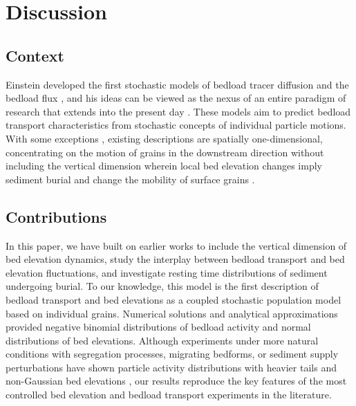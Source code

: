 \section{Discussion}
\label{sec:discussion}

\subsection{Context}
Einstein developed the first stochastic models of bedload tracer diffusion \citep{Einstein1937} and the bedload flux \citep{Einstein1950}, and his ideas can be viewed as the nexus of an entire paradigm of research that extends into the present day \citep[e.g.,][]{Hubbell1964, Nakagawa1976,Hassan1991,Ancey2008, Wu2019}.
These models aim to predict bedload transport characteristics from stochastic concepts of individual particle motions.
With some exceptions \citep{Yang1971,Nakagawa1980,Pelosi2016,Wu2019,Wu2019a}, existing descriptions are spatially one-dimensional, concentrating on the motion of grains in the downstream direction without including the vertical dimension wherein local bed elevation changes imply sediment burial \citep{Voepel2013,Martin2014} and change the mobility of surface grains \citep{Yang1971,Nakagawa1980}.

\subsection{Contributions}

In this paper, we have built on earlier works \citep{Ancey2008,Martin2014} to include the vertical dimension of bed elevation dynamics, study the interplay between bedload transport and bed elevation fluctuations, and investigate resting time distributions of sediment undergoing burial.
To our knowledge, this model is the first description of bedload transport and bed elevations as a coupled stochastic population model based on individual grains.
Numerical solutions and analytical approximations provided negative binomial distributions of bedload activity and normal distributions of bed elevations.
Although experiments under more natural conditions with segregation processes,  migrating bedforms, or sediment supply perturbations have shown particle activity distributions with heavier tails \citep{Dhont2018,Saletti2015a} and non-Gaussian bed elevations \citep{Singh2012,Aberle2006}, our results reproduce the key features of the most controlled bed elevation \citep{Wong2007,Martin2014} and bedload transport \citep{Heyman2016,Ancey2008} experiments in the literature.

